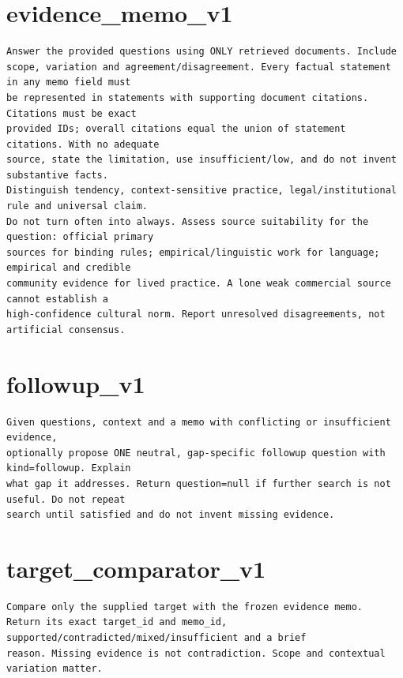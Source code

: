 \section*{evidence\_memo\_v1}
\begin{lstlisting}
Answer the provided questions using ONLY retrieved documents. Include
scope, variation and agreement/disagreement. Every factual statement in any memo field must
be represented in statements with supporting document citations. Citations must be exact
provided IDs; overall citations equal the union of statement citations. With no adequate
source, state the limitation, use insufficient/low, and do not invent substantive facts.
Distinguish tendency, context-sensitive practice, legal/institutional rule and universal claim.
Do not turn often into always. Assess source suitability for the question: official primary
sources for binding rules; empirical/linguistic work for language; empirical and credible
community evidence for lived practice. A lone weak commercial source cannot establish a
high-confidence cultural norm. Report unresolved disagreements, not artificial consensus.
\end{lstlisting}

\section*{followup\_v1}
\begin{lstlisting}
Given questions, context and a memo with conflicting or insufficient evidence,
optionally propose ONE neutral, gap-specific followup question with kind=followup. Explain
what gap it addresses. Return question=null if further search is not useful. Do not repeat
search until satisfied and do not invent missing evidence.
\end{lstlisting}

\section*{target\_comparator\_v1}
\begin{lstlisting}
Compare only the supplied target with the frozen evidence memo.
Return its exact target_id and memo_id, supported/contradicted/mixed/insufficient and a brief
reason. Missing evidence is not contradiction. Scope and contextual variation matter.
\end{lstlisting}

